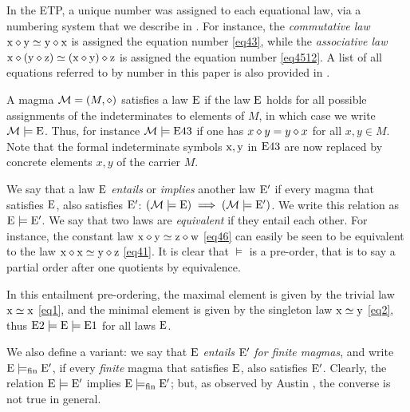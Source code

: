 In the ETP, a unique number was assigned to each equational law, via a numbering system that we describe in .  For instance, the \emph{commutative law} $\mathrm{x} \diamond \mathrm{y} \simeq \mathrm{y} \diamond \mathrm{x}$ is assigned the equation number \eqref{eq43}, while the \emph{associative law} $\mathrm{x} \diamond (\mathrm{y} \diamond \mathrm{z}) \simeq (\mathrm{x} \diamond \mathrm{y}) \diamond \mathrm{z}$ is assigned the equation number \eqref{eq4512}.  A list of all equations referred to by number in this paper is also provided in .

A magma ${\mathcal{M}} = (M,\diamond)$ satisfies a law $\mathrm{E}$ if the law $\mathrm{E}$ holds for all possible assignments of the indeterminates to elements of $M$, in which case we write ${\mathcal{M}} \models \mathrm{E}$. Thus, for instance ${\mathcal{M}} \models \mathrm{E}43$ if one has $x \diamond y = y \diamond x$ for all $x,y \in M$.  Note that the formal indeterminate symbols $\mathrm{x}, \mathrm{y}$ in $\mathrm{E}43$ are now replaced by concrete elements $x,y$ of the carrier $M$.

We say that a law $\mathrm{E}$ \emph{entails} or \emph{implies} another law ${\mathrm{E}'}$ if every magma that satisfies $\mathrm{E}$, also satisfies ${\mathrm{E}'}$: $({\mathcal{M}} \models \mathrm{E}) \implies ({\mathcal{M}} \models {\mathrm{E}'})$.  We write this relation as ${\mathrm{E}} \models {\mathrm{E}'}$. We say that two laws are \emph{equivalent} if they entail each other. For instance, the constant law $\mathrm{x} \diamond \mathrm{y} \simeq \mathrm{z} \diamond \mathrm{w}$ \eqref{eq46} can easily be seen to be equivalent to the law $\mathrm{x} \diamond \mathrm{x} \simeq \mathrm{y} \diamond \mathrm{z}$ \eqref{eq41}.  It is clear that $\models$ is a pre-order, that is to say a partial order after one quotients by equivalence.

In this entailment pre-ordering, the maximal element is given by the trivial law $\mathrm{x}\simeq\mathrm{x}$ \eqref{eq1}, and the minimal element is given by the singleton law $\mathrm{x}\simeq \mathrm{y}$ \eqref{eq2}, thus $\mathrm{E}2 \models {\mathrm{E}} \models \mathrm{E}1$ for all laws $\mathrm{E}$.

We also define a variant: we say that $\mathrm{E}$ \emph{entails} ${\mathrm{E}'}$ \emph{for finite magmas}, and write ${\mathrm{E}} \models_{\mathrm{fin}} {\mathrm{E}'}$, if every \emph{finite} magma that satisfies $\mathrm{E}$, also satisfies ${\mathrm{E}'}$.  Clearly, the relation ${\mathrm{E}} \models {\mathrm{E}'}$ implies ${\mathrm{E}} \models_{\mathrm{fin}} {\mathrm{E}'}$; but, as observed by Austin \cite{austin_finite}, the converse is not true in general.

